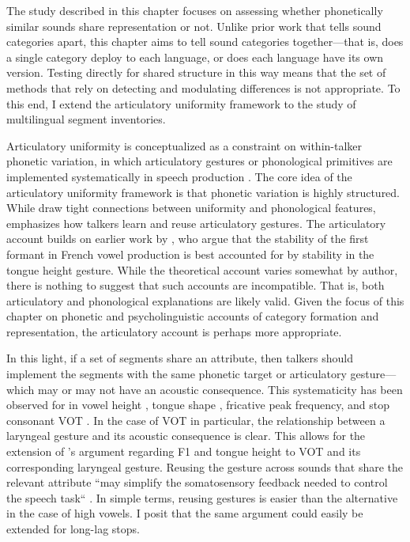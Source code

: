 The study described in this chapter focuses on assessing whether phonetically similar sounds share representation or not. Unlike prior work that tells sound categories apart, this chapter aims to tell sound categories together---that is, does a single category deploy to each language, or does each language have its own version. Testing directly for shared structure in this way means that the set of methods that rely on detecting and modulating differences is not appropriate. To this end, I extend the articulatory uniformity framework to the study of multilingual segment inventories. 

Articulatory uniformity is conceptualized as a constraint on within-talker phonetic variation, in which articulatory gestures or phonological primitives are implemented systematically in speech production \citep{chodroff_2017_structure, faytak_2018_uniformity, menard_2008_invariance}. The core idea of the articulatory uniformity framework is that phonetic variation is highly structured. While \citet{chodroff_2017_structure} draw tight connections between uniformity and phonological features, \citet{faytak_2018_uniformity} emphasizes how talkers learn and reuse articulatory gestures. The articulatory account builds on earlier work by \citet{menard_2008_invariance}, who argue that the stability of the first formant in French vowel production is best accounted for by stability in the tongue height gesture. While the theoretical account varies somewhat by author, there is nothing to suggest that such accounts are incompatible. That is, both articulatory and phonological explanations are likely valid. Given the focus of this chapter on phonetic and psycholinguistic accounts of category formation and representation, the articulatory account is perhaps more appropriate. %

In this light, if a set of segments share an attribute, then talkers should implement the segments with the same phonetic target or articulatory gesture---which may or may not have an acoustic consequence. This systematicity has been observed for in vowel height \citep{menard_2008_invariance}, tongue shape \citep{faytak_2018_uniformity}, fricative peak frequency, and stop consonant VOT \citep{chodroff_2017_structure}. In the case of VOT in particular, the relationship between a laryngeal gesture and its acoustic consequence is clear. This allows for the extension of \citeauthor{menard_2008_invariance}'s \citeyearpar{menard_2008_invariance} argument regarding F1 and tongue height to VOT and its corresponding laryngeal gesture. Reusing the gesture across sounds that share the relevant attribute ``may simplify the somatosensory feedback needed to control the speech task`` \citep[][p. 26]{menard_2008_invariance}. In simple terms, reusing gestures is easier than the alternative in the case of high vowels. I posit that the same argument could easily be extended for long-lag stops. 

